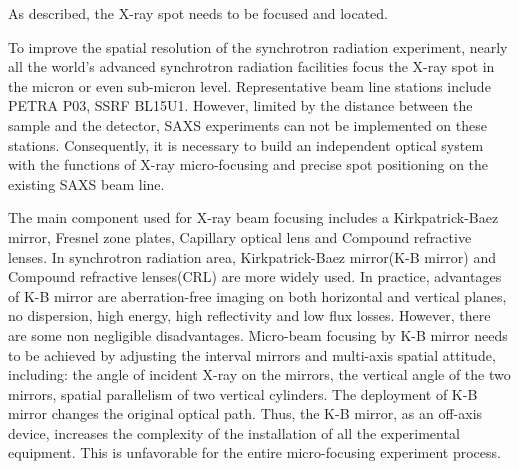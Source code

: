 \documentclass{Head}
\begin{document}
As described, the X-ray spot needs to be focused and located.


To improve the spatial resolution of the synchrotron radiation experiment, nearly all the world’s advanced synchrotron radiation facilities focus the X-ray spot in the micron or even sub-micron level.
Representative beam line stations include PETRA \uppercase\expandafter{} P03, SSRF BL15U1.
However, limited by the distance between the sample and the detector, SAXS experiments can not be implemented on these stations.
Consequently, it is necessary to build an independent optical system with the functions of X-ray micro-focusing and precise spot positioning on the existing SAXS beam line.


The main component used for X-ray beam focusing includes a Kirkpatrick-Baez mirror, Fresnel zone plates, Capillary optical lens and Compound refractive lenses.
In synchrotron radiation area, Kirkpatrick-Baez mirror(K-B mirror) and Compound refractive lenses(CRL) are more widely used.
In practice, advantages of K-B mirror are aberration-free imaging on both horizontal and vertical planes, no dispersion, high energy, high reflectivity and low flux losses.
However, there are some non negligible disadvantages.
Micro-beam focusing by K-B mirror needs to be achieved by adjusting the interval mirrors and multi-axis spatial attitude, including: the angle of incident X-ray on the mirrors, the vertical angle of the two mirrors, spatial parallelism of two vertical cylinders.
The deployment of K-B mirror changes the original optical path.
Thus, the K-B mirror, as an off-axis device, increases the complexity of the installation of all the experimental equipment.
This is unfavorable for the entire micro-focusing experiment process.
\end{document}
